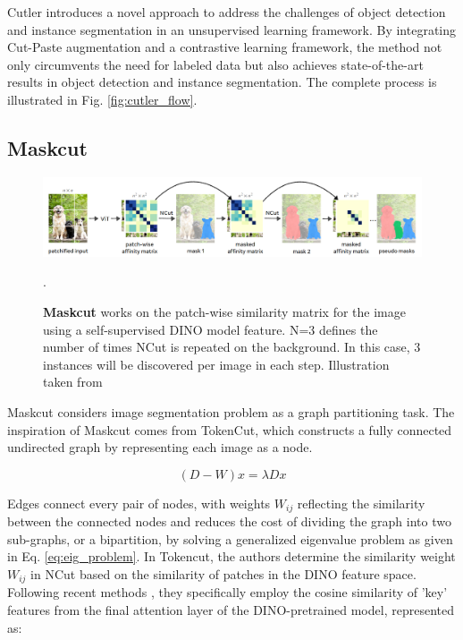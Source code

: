 {Cutler\cite{wang2023cut} introduces a novel approach to address the challenges of object detection and instance segmentation in an unsupervised learning framework. By integrating Cut-Paste\cite{li2021cutpasteselfsupervisedlearninganomaly} augmentation and a contrastive learning framework, the method not only circumvents the need for labeled data but also achieves state-of-the-art results in object detection and instance segmentation. The complete process is illustrated in Fig. \ref{fig:cutler_flow}.
 
\subsection{Maskcut}
\begin{figure}
	\centering
	\includegraphics[width=1.0\textwidth]{Images/main/maskcut_eg.png}
	\caption[\textbf{Maskcut flow}]{\textbf{Maskcut} works on the patch-wise
		similarity matrix for the image using a self-supervised DINO \cite{caron2021emerging} model feature. N=3 defines the number of times NCut\cite{normcut} is repeated on the background. In this case, 3 instances will be discovered per image in each step. Illustration taken from \cite{wang2023cut}}.
	\label{fig:maskcut_flow}
\end{figure}
Maskcut considers image segmentation problem as a graph partitioning task\cite{normcut}. The inspiration of Maskcut comes from TokenCut\cite{wang2022tokencut}, which constructs a fully connected undirected graph by representing each image as a node. 

\begin{equation}
	\label{eq:eig_problem}
	(D - W)x = \lambda Dx
\end{equation}

Edges connect every pair of nodes, with weights \(W_{ij}\) reflecting the similarity between the connected nodes and reduces the cost of dividing the graph into two sub-graphs, or a bipartition, by solving a generalized eigenvalue problem as given in Eq. \ref{eq:eig_problem}. In Tokencut\cite{wang2022tokencut}, the authors determine the similarity weight \( W_{ij} \) in NCut based on the similarity of patches in the DINO feature space. Following recent methods \cite{simeoni2021localizingobjectsselfsupervisedtransformers, vangansbeke2022discoveringobjectmaskstransformers, wang2023tokencutsegmentingobjectsimages}, they specifically employ the cosine similarity of 'key' features from the final attention layer of the DINO-pretrained model, represented as:

}
